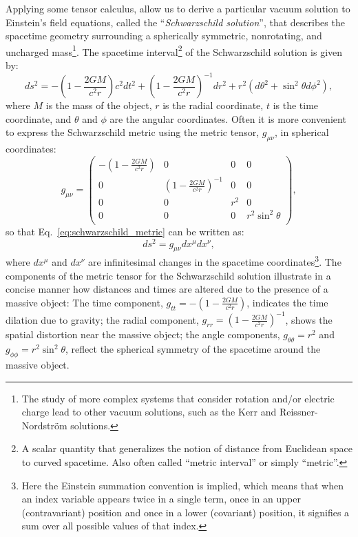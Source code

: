 \documentclass[main.tex]{subfiles}
\begin{document}
    Applying some tensor calculus, allow us to derive a particular vacuum solution to Einstein's field equations, called the ``\textit{Schwarzschild solution}'', that describes the spacetime geometry surrounding a spherically symmetric, nonrotating, and uncharged mass\footnote{The study of more complex systems that consider rotation and/or electric charge lead to other vacuum solutions, such as the Kerr and Reissner-Nordstr\"om solutions.}. The spacetime interval\footnote{A scalar quantity that generalizes the notion of distance from Euclidean space to curved spacetime. Also often called ``metric interval'' or simply ``metric''.} of the Schwarzschild solution is given by:
    \begin{equation}\label{eq:schwarzschild_metric}
        ds^2 = -\left(1 - \frac{2GM}{c^2r}\right)c^2dt^2 + \left(1 - \frac{2GM}{c^2r}\right)^{-1}dr^2 + r^2(d\theta^2 + \sin^2\theta d\phi^2),
    \end{equation}
    where $M$ is the mass of the object, $r$ is the radial coordinate, $t$ is the time coordinate, and $\theta$ and $\phi$ are the angular coordinates. 
    Often it is more convenient to express the Schwarzschild metric using the metric tensor, $g_{\mu \nu}$, in spherical coordinates:
    \begin{equation}\label{eq:schwarzschild_metric_matrix}
        g_{\mu\nu} = 
        \begin{pmatrix}
        -\left(1 - \frac{2GM}{c^2r}\right) & 0 & 0 & 0 \\
        0 & \left(1 - \frac{2GM}{c^2r}\right)^{-1} & 0 & 0 \\
        0 & 0 & r^2 & 0 \\
        0 & 0 & 0 & r^2\sin^2\theta \\
        \end{pmatrix},
    \end{equation}
    so that Eq.~\eqref{eq:schwarzschild_metric} can be written as:
    \begin{equation}\label{eq:schwarzschild_metric2}
        ds^2 = g_{\mu \nu}dx^\mu dx^\nu,
    \end{equation}
    where $dx^\mu$ and $dx^\nu$ are infinitesimal changes in the spacetime coordinates\footnote{Here the Einstein summation convention is implied, which means that when an index variable appears twice in a single term, once in an upper (contravariant) position and once in a lower (covariant) position, it signifies a sum over all possible values of that index.}.
    The components of the metric tensor for the Schwarzschild solution illustrate in a concise manner how distances and times are altered due to the presence of a massive object: The time component, $g_{tt} = -\left(1 - \frac{2GM}{c^2r}\right)$, indicates the time dilation due to gravity; the radial component, $g_{rr} = \left(1 - \frac{2GM}{c^2r}\right)^{-1}$, shows the spatial distortion near the massive object; the angle components, $g_{\theta\theta} = r^2$ and $g_{\phi\phi} = r^2\sin^2\theta$, reflect the spherical symmetry of the spacetime around the massive object. 
\end{document}
